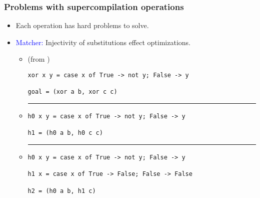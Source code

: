 \documentclass{beamer}
\begin{document}
\begin{frame}[fragile]
    \frametitle{Problems with supercompilation operations}

    \begin{itemize}
        \item[]
            Each operation has hard problems to solve.

        \item[]
            \textcolor{blue}{Matcher:} Injectivity of substitutions effect
            optimizations.
            \begin{itemize}[<+(1)->]
                \item[]
                    (from \citet{callbyneed-sc})

                    \begin{verbatim}
xor x y = case x of True -> not y; False -> y

goal = (xor a b, xor c c)
                    \end{verbatim}

                \item[]
                    \centering\noindent\rule{4cm}{0.4pt}
                    \bigskip
                    \begin{verbatim}
h0 x y = case x of True -> not y; False -> y

h1 = (h0 a b, h0 c c)
                    \end{verbatim}

                \item[]
                    \centering\noindent\rule{4cm}{0.4pt}
                    \bigskip
                    \begin{verbatim}
h0 x y = case x of True -> not y; False -> y

h1 x = case x of True -> False; False -> False

h2 = (h0 a b, h1 c)
                    \end{verbatim}
            \end{itemize}
    \end{itemize}
\end{frame}
\end{document}
